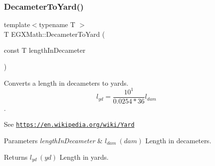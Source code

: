 \subsubsection{\texorpdfstring{Decameter\+To\+Yard()}{DecameterToYard()}}
{\footnotesize\ttfamily template$<$typename T $>$ \\
T E\+G\+X\+Math\+::\+Decameter\+To\+Yard (\begin{DoxyParamCaption}\item[{const T}]{length\+In\+Decameter }\end{DoxyParamCaption})}



Converts a length in decameters to yards. \[ l_{yd}= \frac{10^{1}}{0.0254 * 36} l_{dam} \]. 

See \href{https://en.wikipedia.org/wiki/Yard}{\tt https\+://en.\+wikipedia.\+org/wiki/\+Yard} 
\begin{DoxyParams}{Parameters}
{\em length\+In\+Decameter} & $ l_{dam}\ (dam)$ Length in decameters. \\
\hline
\end{DoxyParams}
\begin{DoxyReturn}{Returns}
$ l_{yd}\ (yd)$ Length in yards. 
\end{DoxyReturn}
